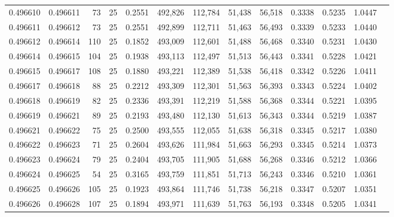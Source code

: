 \begin{tabular}{rrrrrrrrrrrrr}
0.496610 & 0.496611 &    73 &  25 &                                     0.2551 & 492,826 & 112,784 &  51,438 &  56,518 & 0.3338 & 0.5235 & 1.0447 \\
0.496611 & 0.496612 &    73 &  25 &                                     0.2551 & 492,899 & 112,711 &  51,463 &  56,493 & 0.3339 & 0.5233 & 1.0440 \\
0.496612 & 0.496614 &   110 &  25 &                                     0.1852 & 493,009 & 112,601 &  51,488 &  56,468 & 0.3340 & 0.5231 & 1.0430 \\
0.496614 & 0.496615 &   104 &  25 &                                     0.1938 & 493,113 & 112,497 &  51,513 &  56,443 & 0.3341 & 0.5228 & 1.0421 \\
0.496615 & 0.496617 &   108 &  25 &                                     0.1880 & 493,221 & 112,389 &  51,538 &  56,418 & 0.3342 & 0.5226 & 1.0411 \\
0.496617 & 0.496618 &    88 &  25 &                                     0.2212 & 493,309 & 112,301 &  51,563 &  56,393 & 0.3343 & 0.5224 & 1.0402 \\
0.496618 & 0.496619 &    82 &  25 &                                     0.2336 & 493,391 & 112,219 &  51,588 &  56,368 & 0.3344 & 0.5221 & 1.0395 \\
0.496619 & 0.496621 &    89 &  25 &                                     0.2193 & 493,480 & 112,130 &  51,613 &  56,343 & 0.3344 & 0.5219 & 1.0387 \\
0.496621 & 0.496622 &    75 &  25 &                                     0.2500 & 493,555 & 112,055 &  51,638 &  56,318 & 0.3345 & 0.5217 & 1.0380 \\
0.496622 & 0.496623 &    71 &  25 &                                     0.2604 & 493,626 & 111,984 &  51,663 &  56,293 & 0.3345 & 0.5214 & 1.0373 \\
0.496623 & 0.496624 &    79 &  25 &                                     0.2404 & 493,705 & 111,905 &  51,688 &  56,268 & 0.3346 & 0.5212 & 1.0366 \\
0.496624 & 0.496625 &    54 &  25 &                                     0.3165 & 493,759 & 111,851 &  51,713 &  56,243 & 0.3346 & 0.5210 & 1.0361 \\
0.496625 & 0.496626 &   105 &  25 &                                     0.1923 & 493,864 & 111,746 &  51,738 &  56,218 & 0.3347 & 0.5207 & 1.0351 \\
0.496626 & 0.496628 &   107 &  25 &                                     0.1894 & 493,971 & 111,639 &  51,763 &  56,193 & 0.3348 & 0.5205 & 1.0341 \\

\end{tabular}
